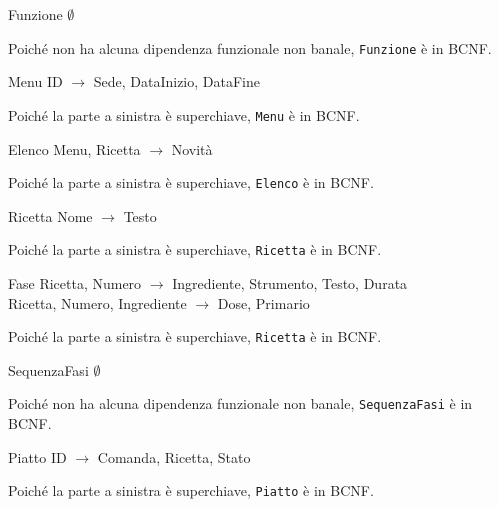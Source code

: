 \begin{samepage}
\begin{funcdep}{Funzione}
    $\emptyset$
\end{funcdep}
Poiché non ha alcuna dipendenza funzionale non banale, {\tt Funzione} è in BCNF.
\end{samepage}

\begin{samepage}
\begin{funcdep}{Menu}
    ID $\to$ Sede, DataInizio, DataFine
\end{funcdep}
Poiché la parte a sinistra è superchiave, {\tt Menu} è in BCNF.
\end{samepage}

\begin{samepage}
\begin{funcdep}{Elenco}
    Menu, Ricetta $\to$ Novità
\end{funcdep}
Poiché la parte a sinistra è superchiave, {\tt Elenco} è in BCNF.
\end{samepage}

\begin{samepage}
\begin{funcdep}{Ricetta}
    Nome $\to$ Testo
\end{funcdep}
Poiché la parte a sinistra è superchiave, {\tt Ricetta} è in BCNF.
\end{samepage}

\begin{samepage}
\begin{funcdep}{Fase}
    Ricetta, Numero $\to$ Ingrediente, Strumento, Testo, Durata\\
    Ricetta, Numero, Ingrediente $\to$ Dose, Primario
\end{funcdep}
Poiché la parte a sinistra è superchiave, {\tt Ricetta} è in BCNF.
\end{samepage}

\begin{samepage}
\begin{funcdep}{SequenzaFasi}
    $\emptyset$
\end{funcdep}
Poiché non ha alcuna dipendenza funzionale non banale, {\tt SequenzaFasi} è in BCNF.
\end{samepage}

\begin{samepage}
\begin{funcdep}{Piatto}
    ID $\to$ Comanda, Ricetta, Stato
\end{funcdep}
Poiché la parte a sinistra è superchiave, {\tt Piatto} è in BCNF.
\end{samepage}

